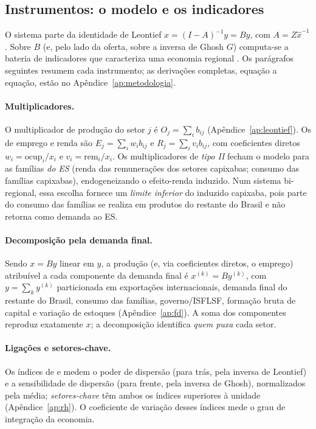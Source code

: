 \documentclass[11pt,a4paper]{article}
\begin{document}
\subsection{Instrumentos: o modelo e os indicadores}
\label{sec:instrumentos}
O sistema parte da identidade de Leontief $x=(I-A)^{-1}y=By$, com $A=Z\hat{x}^{-1}$.
Sobre $B$ (e, pelo lado da oferta, sobre a inversa de Ghosh $G$) computa-se a bateria
de indicadores que caracteriza uma economia regional \citep{millerblair2009}. Os parágrafos
seguintes resumem cada instrumento; as derivações completas, equação a equação, estão no
Apêndice~\ref{ap:metodologia}.

\paragraph{Multiplicadores.}
O multiplicador de produção do setor $j$ é $O_j=\sum_i b_{ij}$ (Apêndice~\ref{ap:leontief}).
Os de emprego e renda são $E_j=\sum_i w_i b_{ij}$ e $R_j=\sum_i v_i b_{ij}$, com coeficientes
diretos $w_i=\text{ocup}_i/x_i$ e $v_i=\text{rem}_i/x_i$. Os multiplicadores de \emph{tipo II}
fecham o modelo para as famílias \emph{do ES} (renda das remunerações dos setores capixabas;
consumo das famílias capixabas), endogeneizando o efeito-renda induzido. Num sistema
bi-regional, essa escolha fornece um \emph{limite inferior} do induzido capixaba, pois parte do
consumo das famílias se realiza em produtos do restante do Brasil e não retorna como demanda
ao ES.

\paragraph{Decomposição pela demanda final.}
Sendo $x=By$ linear em $y$, a produção (e, via coeficientes diretos, o emprego)
atribuível a cada componente da demanda final é $x^{(k)}=By^{(k)}$, com
$y=\sum_k y^{(k)}$ particionada em exportações internacionais, demanda final do
restante do Brasil, consumo das famílias, governo/ISFLSF, formação bruta de capital e variação
de estoques (Apêndice~\ref{ap:fd}). A soma dos componentes reproduz exatamente $x$; a
decomposição identifica \emph{quem puxa} cada setor.

\paragraph{Ligações e setores-chave.}
Os índices de \citet{rasmussen1956} e \citet{hirschman1958} medem o poder de dispersão (para
trás, pela inversa de Leontief) e a sensibilidade de dispersão (para frente, pela inversa de
Ghosh), normalizados pela média; \emph{setores-chave} têm ambos os índices superiores à
unidade (Apêndice~\ref{ap:rh}). O coeficiente de variação desses índices mede o grau de
integração da economia.
\end{document}
